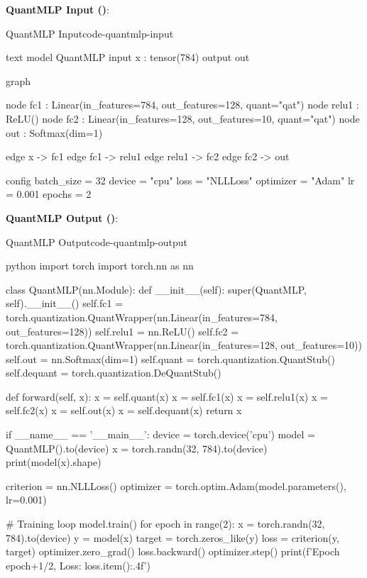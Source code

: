 \documentclass{nngraph-en}
\begin{document}
\textbf{QuantMLP Input ()}:
\begin{codebox}{QuantMLP Input}{code-quantmlp-input}
\begin{amzcode}[fontsize=\scriptsize]{text}
model QuantMLP {
    input x : tensor(784)
    output out
}

graph {
    node fc1   : Linear(in_features=784, out_features=128, quant="qat")
    node relu1 : ReLU()
    node fc2   : Linear(in_features=128, out_features=10, quant="qat")
    node out   : Softmax(dim=1)

    edge x -> fc1
    edge fc1 -> relu1
    edge relu1 -> fc2
    edge fc2 -> out
}

config {
    batch_size = 32
    device = "cpu"
    loss = "NLLLoss"
    optimizer = "Adam"
    lr = 0.001
    epochs = 2
}
\end{amzcode}
\end{codebox}

\textbf{QuantMLP Output ()}:
\begin{codebox}{QuantMLP Output}{code-quantmlp-output}
\begin{amzcode}[fontsize=\scriptsize]{python}
import torch
import torch.nn as nn

class QuantMLP(nn.Module):
    def __init__(self):
        super(QuantMLP, self).__init__()
        self.fc1 = torch.quantization.QuantWrapper(nn.Linear(in_features=784, out_features=128))
        self.relu1 = nn.ReLU()
        self.fc2 = torch.quantization.QuantWrapper(nn.Linear(in_features=128, out_features=10))
        self.out = nn.Softmax(dim=1)
        self.quant = torch.quantization.QuantStub()
        self.dequant = torch.quantization.DeQuantStub()

    def forward(self, x):
        x = self.quant(x)
        x = self.fc1(x)
        x = self.relu1(x)
        x = self.fc2(x)
        x = self.out(x)
        x = self.dequant(x)
        return x

if __name__ == '__main__':
    device = torch.device('cpu')
    model = QuantMLP().to(device)
    x = torch.randn(32, 784).to(device)
    print(model(x).shape)

    criterion = nn.NLLLoss()
    optimizer = torch.optim.Adam(model.parameters(), lr=0.001)

    # Training loop
    model.train()
    for epoch in range(2):
        x = torch.randn(32, 784).to(device)
        y = model(x)
        target = torch.zeros_like(y)
        loss = criterion(y, target)
        optimizer.zero_grad()
        loss.backward()
        optimizer.step()
        print(f'Epoch {epoch+1}/2, Loss: {loss.item():.4f}')
\end{amzcode}
\end{codebox}
\end{document}
